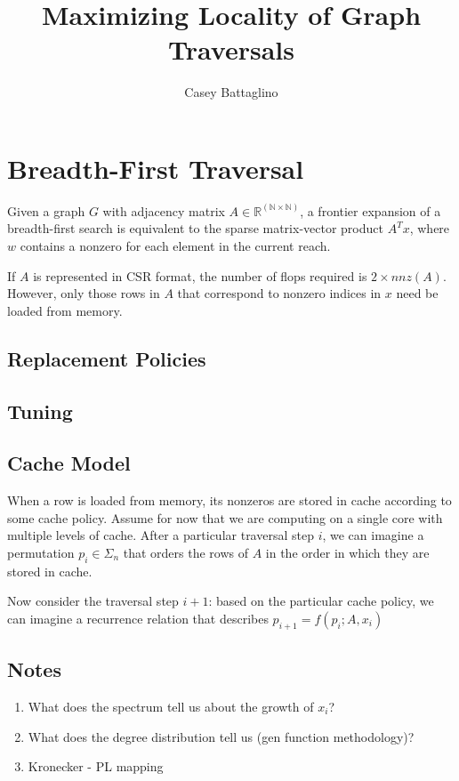 \documentclass[11pt]{article}
\title{Maximizing Locality of Graph Traversals}
\author{Casey Battaglino}
\date{}
\begin{document}
\maketitle

\section{Breadth-First Traversal}

Given a graph $G$ with adjacency matrix $A \in \mathbb{R^{(N \times N)}}$, a frontier expansion of a breadth-first search is equivalent to the sparse matrix-vector product $A^Tx$, where $w$ contains a nonzero for each element in the current reach. 

If $A$ is represented in CSR format, the number of flops required is $2 \times nnz(A)$. However, only those rows in $A$ that correspond to nonzero indices in $x$ need be loaded from memory. 

\subsection{Replacement Policies}
\cite{Dan:1990:AAL:98457.98525}

\subsection{Tuning}
\cite{Xia_topologicallyadaptive}

\subsection{Cache Model}
When a row is loaded from memory, its nonzeros are stored in cache according to some cache policy. Assume for now that we are computing on a single core with multiple levels of cache. After a particular traversal step $i$, we can imagine a permutation $p_i \in \Sigma_n$ that orders the rows of $A$ in the order in which they are stored in cache. 

Now consider the traversal step $i+1$: based on the particular cache policy, we can imagine a recurrence relation that describes $p_{i+1}=f(p_i; A, x_i)$

\subsection{Notes}
\begin{enumerate}
\item What does the spectrum tell us about the growth of $x_i$?
\item What does the degree distribution tell us (gen function methodology)?
\item Kronecker - PL mapping
\end{enumerate}






\end{document}
